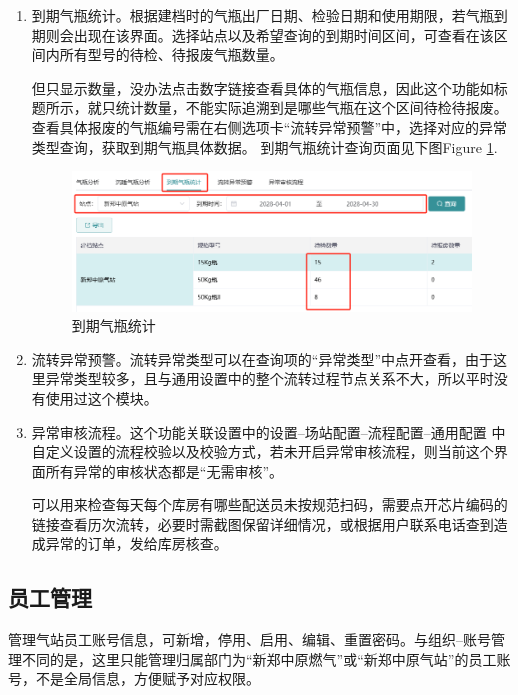 \documentclass[UTF8]{ctexart}
\begin{document}
\begin{enumerate}
\begin{itemize}
	\end{itemize}
	
	\item 到期气瓶统计。根据建档时的气瓶出厂日期、检验日期和使用期限，若气瓶到期则会出现在该界面。选择站点以及希望查询的到期时间区间，可查看在该区间内所有型号的待检、待报废气瓶数量。
	
	但只显示数量，没办法点击数字链接查看具体的气瓶信息，因此这个功能如标题所示，就只统计数量，不能实际追溯到是哪些气瓶在这个区间待检待报废。查看具体报废的气瓶编号需在右侧选项卡“流转异常预警”中，选择对应的异常类型查询，获取到期气瓶具体数据。
	到期气瓶统计查询页面见下图Figure \ref{fig:overdue}.
	\begin{figure}[h]
		\centering
		\includegraphics[width=1\textwidth]{dlh_tutorial_figs/overdue}
		\caption{到期气瓶统计}
		\label{fig:overdue}
	\end{figure}
	
	\item 流转异常预警。流转异常类型可以在查询项的“异常类型”中点开查看，由于这里异常类型较多，且与通用设置中的整个流转过程节点关系不大，所以平时没有使用过这个模块。
	
	\item 异常审核流程。这个功能关联设置中的设置--场站配置--流程配置--通用配置 中自定义设置的流程校验以及校验方式，若未开启异常审核流程，则当前这个界面所有异常的审核状态都是“无需审核”。
	
	可以用来检查每天每个库房有哪些配送员未按规范扫码，需要点开芯片编码的链接查看历次流转，必要时需截图保留详细情况，或根据用户联系电话查到造成异常的订单，发给库房核查。
	
	
\end{enumerate}




\subsection{员工管理}

管理气站员工账号信息，可新增，停用、启用、编辑、重置密码。与组织--账号管理不同的是，这里只能管理归属部门为“新郑中原燃气”或“新郑中原气站”的员工账号，不是全局信息，方便赋予对应权限。
\end{document}
